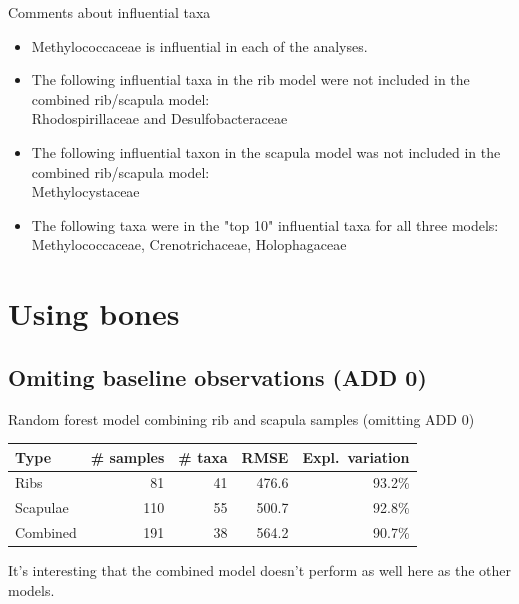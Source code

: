 \documentclass{beamer}
\begin{document}
\begin{frame}{Comments about influential taxa}

  \begin{itemize}
    \item Methylococcaceae is influential in each of the analyses.
    \item The following influential taxa in the rib model were not included in
    the combined rib/scapula model:\\
    Rhodospirillaceae and Desulfobacteraceae
    \item The following influential taxon in the scapula model was not included
    in the combined rib/scapula model:\\
    Methylocystaceae
    \item The following taxa were in the "top 10" influential taxa for all
    three models:\\
    Methylococcaceae, Crenotrichaceae, Holophagaceae
  \end{itemize}

\end{frame}





\section{Using bones}


\subsection{Omiting baseline observations (ADD 0)}

\begin{frame}{Random forest model combining rib and scapula samples (omitting ADD 0)}

  \begin{tabular}{lrrrr}
    Type & \# samples & \# taxa & RMSE & Expl.\ variation\\ \hline
    Ribs & 81 & 41 & 476.6 & 93.2\% \\
    Scapulae & 110 & 55 & 500.7 &  92.8\% \\
    Combined & 191 & 38 & 564.2 & 90.7\%
  \end{tabular}
  
  \vspace{0.2in}

  \footnotesize{
    \noindent It's interesting that the combined model doesn't perform as well
    here as the other models.
  }

\end{frame}
\end{document}
